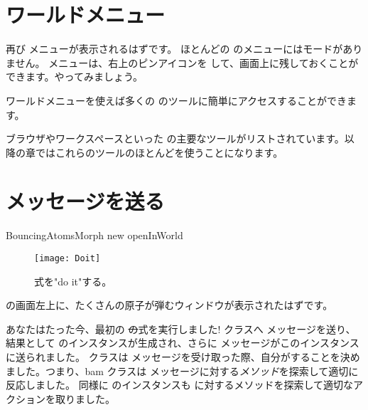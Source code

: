 \documentclass[a4paper,10pt,twoside]{book}
\begin{document}
\section{ワールドメニュー}

再び  メニューが表示されるはずです。
ほとんどの \pharo のメニューにはモードがありません。 メニューは、右上のピンアイコンを \click して、画面上に残しておくことができます。やってみましょう。

ワールドメニューを使えば多くの \pharo のツールに簡単にアクセスすることができます。


ブラウザやワークスペースといった \pharo の主要なツールがリストされています。以降の章ではこれらのツールのほとんどを使うことになります。

\section{メッセージを送る}


\begin{code}{}
BouncingAtomsMorph new openInWorld
\end{code}


\begin{figure}[htb]
\centerline {\texttt{[image: Doit]}}
\caption{式を"do it"する。}
\end{figure}

\pharo の画面左上に、たくさんの原子が弾むウィンドウが表示されたはずです。

あなたはたった今、最初の \st の式を実行しました!
\bam クラスへ  メッセージを送り、結果として \bam のインスタンスが生成され、さらに  メッセージがこのインスタンスに送られました。
\bam クラスは  メッセージを受け取った際、自分がすることを決めました。つまり、bam クラスは  メッセージに対する\emph{メソッド}を探索して適切に反応しました。
同様に \bam のインスタンスも  に対するメソッドを探索して適切なアクションを取りました。
\end{document}
